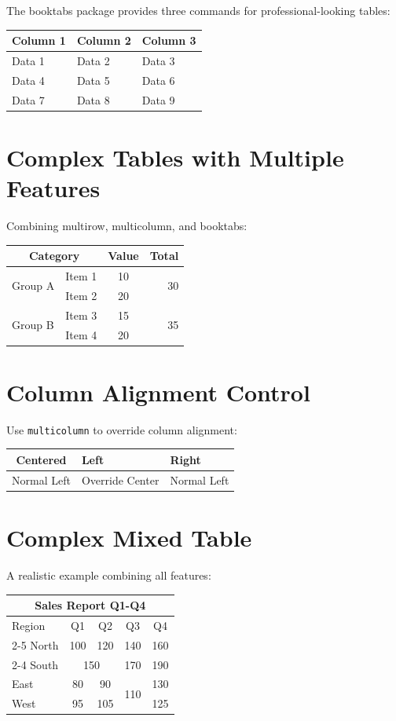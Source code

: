 \documentclass{article}
\begin{document}
The booktabs package provides three commands for professional-looking tables:

\begin{tabular}{lll}
\toprule
\textbf{Column 1} & \textbf{Column 2} & \textbf{Column 3} \\
\midrule
Data 1 & Data 2 & Data 3 \\
Data 4 & Data 5 & Data 6 \\
Data 7 & Data 8 & Data 9 \\
\bottomrule
\end{tabular}

\section{Complex Tables with Multiple Features}

Combining multirow, multicolumn, and booktabs:

\begin{tabular}{lccr}
\toprule
\multicolumn{2}{c}{\textbf{Category}} & \textbf{Value} & \textbf{Total} \\
\midrule
\multirow{2}{*}{Group A} & Item 1 & 10 & \multirow{2}{*}{30} \\
& Item 2 & 20 & \\
\midrule
\multirow{2}{*}{Group B} & Item 3 & 15 & \multirow{2}{*}{35} \\
& Item 4 & 20 & \\
\bottomrule
\end{tabular}

\section{Column Alignment Control}

Use \texttt{multicolumn} to override column alignment:

\begin{tabular}{|l|l|l|}
\hline
\multicolumn{1}{|c|}{Centered} & Left & Right \\
\hline
Normal Left & \multicolumn{1}{c|}{Override Center} & Normal Left \\
\hline
\end{tabular}

\section{Complex Mixed Table}

A realistic example combining all features:

\begin{tabular}{|l|c|c|c|r|}
\hline
\multicolumn{5}{|c|}{\textbf{Sales Report Q1-Q4}} \\
\hline
Region & Q1 & Q2 & Q3 & \multicolumn{1}{|c|}{Q4} \\
\cline{2-5}
North & 100 & 120 & 140 & 160 \\
\cline{2-4}
South & \multicolumn{2}{c|}{150} & 170 & 190 \\
East & 80 & 90 & \multirow{2}{*}{110} & 130 \\
West & 95 & 105 & & 125 \\
\hline
\end{tabular}
\end{document}
